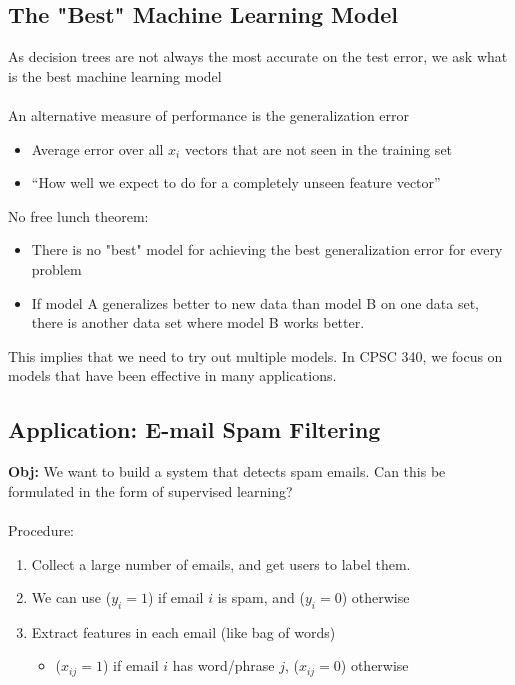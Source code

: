 \documentclass{article}
\theoremstyle{definition}
\begin{document}
\subsection*{The "Best" Machine Learning Model}
As decision trees are not always the most accurate on the test error, we ask what is the {\color{OliveGreen} best machine learning model} \\ \\
An alternative measure of performance is the {\color{blue} generalization error}
\begin{itemize}
	\item Average error over all $ x_i $ vectors that are not seen in the training set
	\item “How well we expect to do for a completely unseen feature vector”
\end{itemize}
{\color{red} No free lunch theorem}:
\begin{itemize}
	\item There is no "best" model for achieving the best generalization error for every problem
	\item If model A generalizes better to new data than model B on one data set, there is another data set where model B works better.
\end{itemize}
This implies that we need to try out multiple models. In CPSC 340, we focus on {\color{blue} models that have been effective in many applications}.

\subsection*{Application: E-mail Spam Filtering}
\textbf{Obj:} We want to build a system that {\color{OliveGreen} detects spam emails}. Can this be formulated in the form of supervised learning? \\ \\
Procedure:
\begin{enumerate}
	\item Collect a large number of emails, and get users to label them.
	\item We can use ($ y_i = 1 $) if email $ i $ is spam, and ($ y_i = 0 $) otherwise
	\item Extract features in each email (like {\color{blue} bag of words})
	\begin{itemize}[label=$ \cdot $]
		\item ($ x_{ij} = 1 $) if email $ i $ has word/phrase $ j $, ($ x_{ij} = 0 $) otherwise
	\end{itemize}
\end{enumerate}
\end{document}
